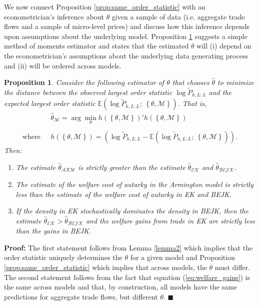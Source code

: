 \documentclass[12pt,dvips, ps2pdf]{article}
\newtheorem{prp}{Proposition}
\begin{document}
We now connect Proposition \ref{prop:same_order_statistic} with an econometrician's inference about $\theta$ given a sample of data (i.e. aggregate trade flows and a sample of micro-level prices) and discuss how this inference depends upon assumptions about the underlying model. Proposition \ref{prp:estimator} suggests a simple method of moments estimator and states that the estimated $\theta$ will (i) depend on the econometrician's assumptions about the underlying data generating process and (ii) will be ordered across models.
\vspace{-.25cm}
\begin{prp}
\label{prp:estimator}
Consider the following estimator of $\theta$ that chooses $\hat \theta$ to minimize the distance between the observed largest order statistic $\log \tilde P_{h,L:L}$  and the expected largest order statistic $\mathbb{E}\left(\log \tilde P_{h,L:L}; \ \left\{\theta,{\mathcal{M}}\right\}\right) $. That is,
\begin{align*}
&\hat \theta_\mathcal{M} = \arg\min_\theta h(\left\{\theta,{\mathcal{M}}\right\})'h(\left\{\theta,{\mathcal{M}}\right\}) \\
\\
\mbox{where} \ \ \  &h(\left\{\theta,{\mathcal{M}}\right\}) = \left(\log \tilde P_{h,L:L} - \mathbb{E}\left(\log \tilde P_{h,L:L}; \ \left\{\theta,{\mathcal{M}}\right\}\right) \right).
\end{align*}
Then:
\begin{enumerate}
\item The estimate $\hat \theta_{\mathcal{ARM}}$ is strictly greater than the estimate $\hat \theta_{\mathcal{EK}}$ and $\hat \theta_{\mathcal{BEJK}}$.

\item The estimate of the welfare cost of autarky in the Armington model is strictly less than the estimate of the welfare cost of autarky in EK and BEJK.

\item If the density in EK stochastically dominates the density in BEJK, then the estimate $\hat \theta_{\mathcal{EK}} > \hat \theta_{\mathcal{BEJK}}$ and the welfare gains from trade in EK are strictly less than the gains in BEJK.
\end{enumerate}
\end{prp}
\vspace{-.25cm}
\textbf{Proof:}  The first statement follows from Lemma \ref{lemma2} which implies that the order statistic uniquely determines the $\theta$ for a given model and Proposition \ref{prop:same_order_statistic} which implies that across models, the $\theta$ must differ. The second statement follows from the fact that equation (\ref{eq:welfare_gains}) is the same across models and that, by construction, all models have the same predictions for aggregate trade flows, but different $\theta$. $\blacksquare$
\end{document}
